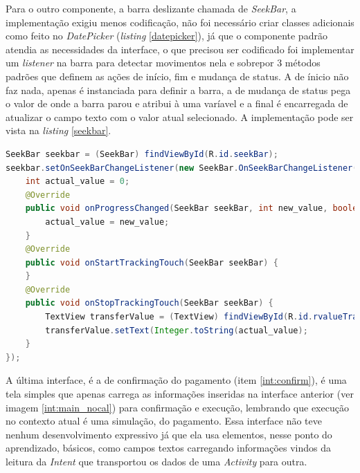 \documentclass[hidelinks,12pt]{article}
\begin{document}
Para o outro componente, a barra deslizante chamada de \textit{SeekBar}, a implementa\c{c}\~ao exigiu menos codifica\c{c}\~ao, n\~ao foi necess\'ario criar classes adicionais como feito no \textit{DatePicker} (\textit{listing} \ref{datepicker}), j\'a que o componente padr\~ao atendia as necessidades da interface, o que precisou ser codificado foi implementar um \textit{listener} na barra para detectar movimentos nela e sobrepor 3 m\'etodos padr\~oes que definem as a\c{c}\~oes de in\'icio, fim e mudan\c{c}a de status. A de \'inicio n\~ao faz nada, apenas \'e instanciada para definir a barra, a de mudan\c{c}a de status pega o valor de onde a barra parou e atribui \`a uma var\'iavel e a final \'e encarregada de atualizar o campo texto com o valor atual selecionado. A implementa\c{c}\~ao pode ser vista na \textit{listing} \ref{seekbar}.
\newpage
\begin{lstlisting}[language=Java, caption=\textit{SeekBar} do valor, captionpos=b, breaklines=true, label=seekbar]
SeekBar seekbar = (SeekBar) findViewById(R.id.seekBar);
seekbar.setOnSeekBarChangeListener(new SeekBar.OnSeekBarChangeListener(){
	int actual_value = 0;
	@Override
	public void onProgressChanged(SeekBar seekBar, int new_value, boolean b) {
		actual_value = new_value;
	}
	@Override
	public void onStartTrackingTouch(SeekBar seekBar) {
	}
	@Override
	public void onStopTrackingTouch(SeekBar seekBar) {
		TextView transferValue = (TextView) findViewById(R.id.rvalueTransfer);
		transferValue.setText(Integer.toString(actual_value);
	}
});
\end{lstlisting}

A última interface, \'e a de confirma\c{c}\~ao do pagamento (item \ref{int:confirm}), \'e uma tela simples que apenas carrega as informa\c{c}\~oes inseridas na interface anterior (ver imagem \ref{int:main_nocal}) para confirma\c{c}\~ao e execu\c{c}\~ao, lembrando que execu\c{c}\~ao no contexto atual \'e uma simula\c{c}\~ao, do pagamento. Essa interface n\~ao teve nenhum desenvolvimento expressivo j\'a que ela usa elementos, nesse ponto do aprendizado, b\'asicos, como campos textos carregando informa\c{c}\~oes vindos da leitura da \textit{Intent} que transportou os dados de uma \textit{Activity} para outra.
\end{document}
